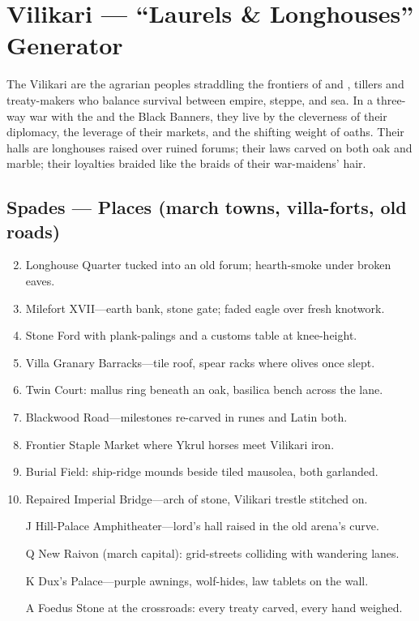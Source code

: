 \section{Vilikari --- ``Laurels \& Longhouses'' Generator}
\label{chap:vilikari}

The Vilikari are the agrarian peoples straddling the frontiers of  and , tillers and treaty-makers who balance survival between empire, steppe, and sea. In a three-way war with the  and the Black Banners, they live by the cleverness of their diplomacy, the leverage of their markets, and the shifting weight of oaths. Their halls are longhouses raised over ruined forums; their laws carved on both oak and marble; their loyalties braided like the braids of their war-maidens’ hair.

\subsection*{Spades --- Places (march towns, villa-forts, old roads)}
\label{sec:vilikari-places}
\begin{enumerate}
\setcounter{enumi}{1}
\item Longhouse Quarter tucked into an old forum; hearth-smoke under broken eaves.
\item Milefort XVII---earth bank, stone gate; faded eagle over fresh knotwork.
\item Stone Ford with plank-palings and a customs table at knee-height.
\item Villa Granary Barracks---tile roof, spear racks where olives once slept.
\item Twin Court: mallus ring beneath an oak, basilica bench across the lane.
\item Blackwood Road---milestones re-carved in runes and Latin both.
\item Frontier Staple Market where Ykrul horses meet Vilikari iron.
\item Burial Field: ship-ridge mounds beside tiled mausolea, both garlanded.
\item Repaired Imperial Bridge---arch of stone, Vilikari trestle stitched on.
\item[J] Hill-Palace Amphitheater---lord's hall raised in the old arena's curve.
\item[Q] New Raivon (march capital): grid-streets colliding with wandering lanes.
\item[K] Dux's Palace---purple awnings, wolf-hides, law tablets on the wall.
\item[A] Foedus Stone at the crossroads: every treaty carved, every hand weighed.
\end{enumerate}

